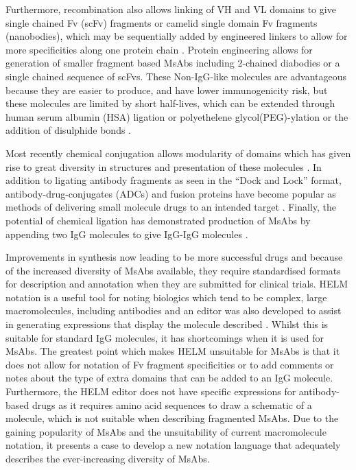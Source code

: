\documentclass{article}
\begin{document}
Furthermore, recombination also allows linking of VH and VL domains to
give single chained Fv (scFv) fragments or camelid single domain Fv
fragments (nanobodies), which may be sequentially added by engineered
linkers to allow for more specificities along one protein chain
\cite{legall:1999}. Protein engineering allows for generation of 
smaller fragment based MsAbs including 2-chained diabodies or a single
chained sequence of scFvs. These Non-IgG-like molecules are
advantageous because they are easier to produce,  and have lower
immunogenicity risk, but these molecules are limited by short
half-lives, which can be extended through human serum albumin (HSA)
ligation or polyethelene glycol(PEG)-ylation or the addition of
disulphide bonds \cite{kontermann:2011,ma:2021}. 

Most recently chemical conjugation allows modularity of domains which
has given rise to great diversity in structures and presentation of
these molecules \cite{spiess:2015}. In addition to ligating antibody
fragments as seen in the ``Dock and Lock'' format,
antibody-drug-conjugates (ADCs) and fusion proteins have become
popular as methods of delivering small molecule drugs to an intended
target \cite{sau:2017}. Finally, the potential of chemical ligation
has demonstrated production of MsAbs by appending two IgG molecules to
give IgG-IgG molecules \cite{szijj:2021}.  

Improvements in synthesis now leading to be more successful drugs and
because of the increased diversity of MsAbs available, they require
standardised formats for description and annotation when they are
submitted for clinical trials. HELM notation is a useful tool for
noting biologics which tend to be complex, large macromolecules,
including antibodies and an editor was also developed to assist in
generating expressions that display the molecule described
\cite{zhang:2012}. Whilst this is suitable for standard IgG molecules,
it has shortcomings when it is used for MsAbs. The greatest point
which makes HELM unsuitable for MsAbs is that it does not allow for
notation of Fv fragment specificities or to add comments or notes
about the type of extra domains that can be added to an IgG
molecule. Furthermore, the HELM editor does not have specific
expressions for antibody-based drugs as it requires amino acid
sequences to draw a schematic of a molecule, which is not suitable
when describing fragmented MsAbs. Due to the gaining popularity of
MsAbs and the unsuitability of current macromolecule notation, it
presents a case to develop a new notation language that adequately
describes the ever-increasing diversity of MsAbs.
\end{document}
